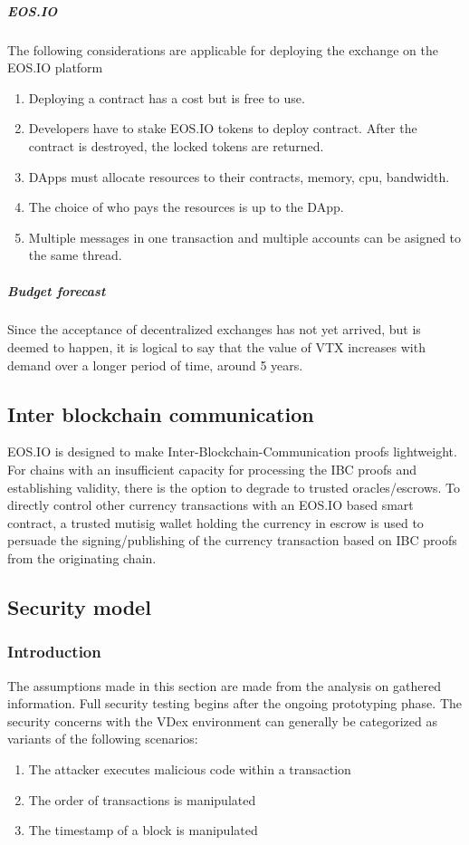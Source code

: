 \documentclass[]{article}
\begin{document}
\subparagraph{EOS.IO}
The following considerations are applicable for deploying the exchange on the EOS.IO platform
\begin{enumerate}
\item Deploying a contract has a cost but is free to use. 
\item Developers have to stake EOS.IO tokens to deploy contract.
After the contract is destroyed, the locked tokens are returned.
\item DApps must allocate resources to their contracts, memory, cpu, bandwidth. 
\item The choice of who pays the resources is up to the DApp.
\item Multiple messages in one transaction and multiple accounts can be asigned to the same thread.

\end{enumerate}

\subparagraph{Budget forecast}
Since the acceptance of decentralized exchanges has not yet arrived, but is deemed to happen, 
it is logical to say that the value of VTX increases with demand over a longer period of time, around 5 years.

\subsection{Inter blockchain communication}
EOS.IO is designed to make Inter-Blockchain-Communication proofs lightweight. 
For chains with an insufficient capacity for processing the  IBC proofs and establishing validity, 
there is the option to degrade to trusted oracles/escrows.
To directly control other currency transactions with an
EOS.IO based smart contract, a trusted mutisig wallet holding the currency 
in escrow is used to persuade the signing/publishing of the currency 
transaction based on IBC proofs from the originating chain.	
\subsection{Security model}
\subsubsection{Introduction}
The assumptions made in this section are made from the analysis on gathered information. 
Full security testing begins after the ongoing prototyping phase. 
The security concerns with the VDex environment can generally be categorized as variants of the following scenarios:
	\begin{enumerate}
		\item The attacker executes malicious code within a transaction
		\item The order of transactions is manipulated
		\item The timestamp of a block is manipulated
	\end{enumerate}
\end{document}
